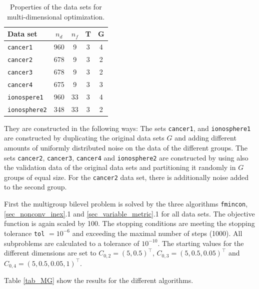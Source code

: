 \begin{table}[H]%
\centering
\begin{tabular}{|lcccc|}
	\hline
	Data set & \(n_d\) & \(n_f\) & T & G \\
	\hline
	\texttt{cancer1} & 960 & 9 & 3 & 4\\
	\texttt{cancer2} & 678 & 9 & 3 & 2\\
	\texttt{cancer3} & 678 & 9 & 3 & 2\\
	\texttt{cancer4} & 675 & 9 & 3 & 3\\
	\texttt{ionospere1} & 960 & 33 & 3 & 4\\
	\texttt{ionosphere2} & 348 & 33 & 3 & 2 \\
	\hline
\end{tabular}
\caption[Properties of the data sets for multi-dimensional optimization]{Properties of the data sets for multi-dimensional optimization.}
\label{}
\end{table}

They are constructed in the following ways:
The sets \texttt{cancer1}, and \texttt{ionosphere1} are constructed by duplicating the original data sets \(G\) and adding different amounts of uniformly distributed noise on the data of the different groups.
The sets \texttt{cancer2}, \texttt{cancer3}, \texttt{cancer4} and \texttt{ionosphere2} are constructed by using also the validation data of the original data sets and partitioning it  randomly in \(G\) groups of equal size.
For the \texttt{cancer2} data set, there is additionally noise added to the second group.

First the multigroup bilevel problem is solved by the three algorithms \texttt{fmincon}, \ref{sec_nonconv_inex}.1 and \ref{sec_variable_metric}.1 for all data sets. The objective function is again scaled by 100. The stopping conditions are meeting the stopping tolerance \texttt{tol} \(=10^{-6}\) and exceeding the maximal number of steps (1000).
All subproblems are calculated to a  tolerance of \(10^{-10}\).
The starting values for the different dimensions are set to 
\(C_{0,2} = (5,0.5)^{\top}\), \(C_{0,3} = (5,0.5,0.05)^{\top}\) and \(C_{0,4} = (5,0.5,0.05,1)^{\top}\). 

Table \ref{tab_MG} show the results for the different algorithms.

